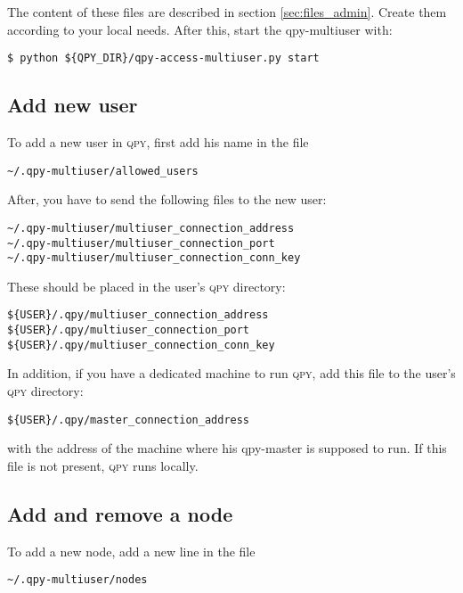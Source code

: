 \documentclass[a4paper,12pt]{article}
\newcommand{\qpy}{\textsc{qpy}}
\begin{document}
The content of these files are described in section \ref{sec:files_admin}.
Create them according to your local needs.
After this, start the qpy-multiuser with:

\begin{lstlisting}[style=BashStyle]
$ python ${QPY_DIR}/qpy-access-multiuser.py start
\end{lstlisting}


\subsection{Add new user}

To add a new user in \qpy{}, first add his name in the file

\begin{verbatim}
~/.qpy-multiuser/allowed_users
\end{verbatim}

After, you have to send the following files to the new user:

\begin{verbatim}
~/.qpy-multiuser/multiuser_connection_address
~/.qpy-multiuser/multiuser_connection_port
~/.qpy-multiuser/multiuser_connection_conn_key
\end{verbatim}

These should be placed in the user's \qpy{} directory:

\begin{verbatim}
${USER}/.qpy/multiuser_connection_address
${USER}/.qpy/multiuser_connection_port
${USER}/.qpy/multiuser_connection_conn_key
\end{verbatim}

In addition, if you have a dedicated machine to run \qpy{}, add this file to the user's \qpy{} directory:

\begin{verbatim}
${USER}/.qpy/master_connection_address
\end{verbatim}

with the address of the machine where his qpy-master is supposed to run.
If this file is not present, \qpy{} runs locally.

\subsection{Add and remove a node}

To add a new node, add a new line in the file

\begin{verbatim}
~/.qpy-multiuser/nodes
\end{verbatim}
\end{document}
